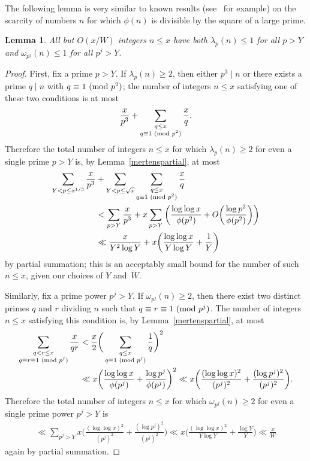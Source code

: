 \documentclass[12pt,reqno]{amsart}
\newtheorem{lemma}[theorem]{Lemma}
\theoremstyle{definition}
\renewcommand{\mod}[1]{{\ifmmode\text{\rm\ (mod~$#1$)}\else\discretionary{}{}{\hbox{ }}\rm(mod~$#1$)\fi}}
\begin{document}
The following lemma is very similar to known results (see~\cite{ep85} for example) on the scarcity of numbers $n$ for which $\phi(n)$ is divisible by the square of a large prime.

\begin{lemma}  \label{truncate at A lemma}
All but $O(x/W)$ integers $n\le x$ have both $\lambda_p(n)\le1$ for all $p>Y$ and $\omega_{p^j}(n)\le1$ for all $p^j>Y$. 
\end{lemma}

\begin{proof}
First, fix a prime $p>Y$. If $\lambda_p(n)\ge2$, then either $p^3\mid n$ or there exists a prime $q\mid n$ with $q\equiv1\mod{p^2}$; the number of integers $n\le x$ satisfying one of these two conditions is at most
\[
\frac x{p^3} + \sum_{\substack{q\le x \\ q\equiv1\mod{p^2}}} \frac xq.
\]
Therefore the total number of integers $n\le x$ for which $\lambda_p(n)\ge2$ for even a single prime $p>Y$ is, by Lemma~\ref{mertenspartial}, at most
\begin{align*}
\sum_{Y<p\le x^{1/3}} \frac x{p^3} &{}+ \sum_{Y<p\le\sqrt x} \sum_{\substack{q\le x \\ q\equiv1\mod{p^2}}} \frac xq \\
&< \sum_{p>Y} \frac x{p^3} + x \sum_{p>Y} \bigg( \frac{\log\log x}{\phi(p^2)} + O\bigg( \frac{\log p^2}{\phi(p^2)} \bigg) \bigg) \\
&\ll \frac x{Y^2\log Y} + x \bigg( \frac{\log\log x}{Y\log Y} + \frac1Y \bigg)
\end{align*}
by partial summation; this is an acceptably small bound for the number of such $n\le x$, given our choices of $Y$ and~$W$.

Similarly, fix a prime power $p^j>Y$. If $\omega_{p^j}(n) \ge 2$, then there exist two distinct primes $q$ and $r$ dividing $n$ such that $q\equiv r\equiv1\mod{p^j}$. The number of integers $n\le x$ satisfying this condition is, by Lemma~\ref{mertenspartial}, at most
\begin{align*}
\sum_{\substack{q<r\le x \\ q\equiv r\equiv1\mod{p^j}}} \frac x{qr} &< \frac x2 \bigg( \sum_{\substack{q\le x \\ q\equiv1\mod{p^j}}} \frac 1q \bigg)^2 \\
&\ll x \bigg( \frac{\log\log x}{\phi(p^j)} + \frac{\log p^j}{\phi(p^j)} \bigg)^2 \ll x \bigg( \frac{(\log\log x)^2}{(p^j)^2} + \frac{(\log p^j)^2}{(p^j)^2} \bigg).
\end{align*}
Therefore the total number of integers $n\le x$ for which $\omega_{p^j}(n) \ge 2$ for even a single prime power $p^j>Y$ is
\begin{align*}
\ll \sum_{p^j>Y} x \bigg( \frac{(\log\log x)^2}{(p^j)^2} + \frac{(\log p^j)^2}{(p^j)^2} \bigg) \ll x \bigg( \frac{(\log\log x)^2}{Y\log Y} + \frac{\log Y}Y \bigg) \ll \frac xW
\end{align*}
again by partial summation.
\end{proof}
\end{document}
